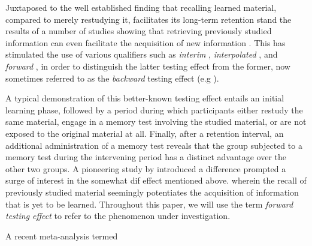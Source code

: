 \documentclass[../main.tex]{subfiles}
\begin{document}
Juxtaposed to the well established finding that recalling learned material, compared to merely restudying it, facilitates its long-term retention \citep{roedigeriiiPowerTestingMemory2006, roedigeriiiTestEnhancedLearningTaking2006, rowlandEffectTestingRestudy2014, adesopeRethinkingUseTests2017, roedigeriiiCriticalRoleRetrieval2011} stand the results of a number of studies showing that retrieving previously studied information can even facilitate the acquisition of new information \citep{chanRetrievalPotentiatesNew2018}. This has stimulated the use of various qualifiers such as \textit{interim} \citep{wissmanInterimTestEffect2011}, \textit{interpolated} \citep{szpunarInterpolatedMemoryTests2013}, and \textit{forward} \citep{pastotterRetrievalPracticeEnhances2014,yangEnhancingLearningRetrieval2018}, in order to distinguish the latter testing effect from the former, now sometimes referred to as the \textit{backward} testing effect (e.g \citealp{yangEnhancingLearningRetrieval2018}). 

A typical demonstration of this better-known testing effect entails an initial learning phase, followed by a period during which participants either restudy the same material, engage in a memory test involving the studied material, or are not exposed to the original material at all. Finally, after a retention interval, an additional administration of a memory test reveals that the group subjected to a memory test during the intervening period has a distinct advantage over the other two groups. A pioneering study by \cite{szpunarTestingStudyInsulates2008} introduced a difference prompted a surge of interest in the somewhat dif effect mentioned above.  wherein the recall of previously studied material seemingly potentiates the acquisition of information that is yet to be learned. Throughout this paper, we will use the term \textit{forward testing effect} to refer to the phenomenon under investigation. 

A recent meta-analysis termed 

{
    \biblio
}
\end{document}
